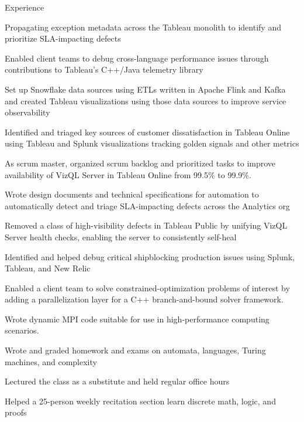 \documentclass{cv}
\begin{document}

\begin{cvsection}{Experience}
  {
    \item Propagating exception metadata across the Tableau monolith to identify and prioritize SLA-impacting defects
    \item Enabled client teams to debug cross-language performance issues through contributions to Tableau's C++/Java telemetry library
    \item Set up Snowflake data sources using ETLs written in Apache Flink and Kafka and created Tableau visualizations using those data sources to improve service observability
    \item Identified and triaged key sources of customer dissatisfaction in Tableau Online using Tableau and Splunk visualizations tracking golden signals and other metrics
    \item As scrum master, organized scrum backlog and prioritized tasks to improve availability of VizQL Server in Tableau Online from 99.5\% to 99.9\%.
    \item Wrote design documents and technical specifications for automation to automatically detect and triage SLA-impacting defects across the Analytics org
    \item Removed a class of high-visibility defects in Tableau Public by unifying VizQL Server health checks, enabling the server to consistently self-heal
    \item Identified and helped debug critical shipblocking production issues using Splunk, Tableau, and New Relic
  }
  {
    \item Enabled a client team to solve constrained-optimization problems of interest by adding a parallelization layer for a C++ branch-and-bound solver framework.
    \item Wrote dynamic MPI code suitable for use in high-performance computing scenarios.
  }
  {
    \item Wrote and graded homework and exams on automata, languages, Turing machines, and complexity
    \item Lectured the class as a substitute and held regular office hours
  }
  {
    \item Helped a 25-person weekly recitation section learn discrete math, logic, and proofs
  }
\end{cvsection}
\end{document}
